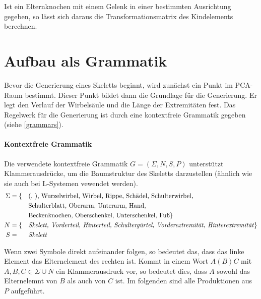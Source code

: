 Ist ein Elternknochen mit einem Gelenk in einer bestimmten Ausrichtung gegeben, so lässt sich daraus die Transformationsmatrix des Kindelements berechnen.


\section{Aufbau als Grammatik}
\label{section:grammar}

Bevor die Generierung eines Skeletts beginnt, wird zunächst ein Punkt im PCA-Raum bestimmt. Dieser Punkt bildet dann die Grundlage für die Generierung. Er legt \zb den Verlauf der Wirbelsäule und die Länge der Extremitäten fest. Das Regelwerk für die Generierung ist durch eine kontextfreie Grammatik gegeben (siehe \ref{grammars}).

\paragraph{Kontextfreie Grammatik}
Die verwendete kontextfreie Grammatik $G = (\Sigma, N, S, P)$ unterstützt Klammerausdrücke, um die Baumstruktur des Skeletts darzustellen (ähnlich wie sie auch bei L-Systemen vewendet werden).
\begin{alignat*}{2}
 \Sigma & = \{&&\text{(, ), Wurzelwirbel, Wirbel, Rippe, Schädel, Schulterwirbel,}\\  
        & &&\text{Schulterblatt, Oberarm, Unterarm, Hand,}\\ 
        & &&\text{Beckenknochen, Oberschenkel, Unterschenkel, Fuß}\}\\
 N &= \{&&\text{\emph{Skelett, Vorderteil, Hinterteil, Schultergürtel, Vorderextremität, Hinterextremität}}\}\\
 S &= &&\text{\emph{Skelett}}
\end{alignat*}

Wenn zwei Symbole direkt aufeinander folgen, so bedeutet das, dass das linke Element das Elternelement des rechten ist. Kommt in einem Wort $A(B)C$ mit $A, B, C \in \Sigma \cup N$ ein Klammerausdruck vor, so bedeutet dies, dass $A$ sowohl das Elternelemnt von $B$ als auch von $C$ ist.
Im folgenden sind alle Produktionen aus $P$ aufgeführt.

